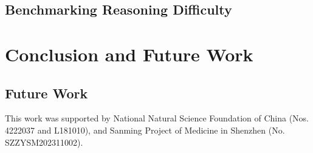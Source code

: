 \documentclass[sigconf, nonacm]{acmart}
\begin{document}
\subsection{Benchmarking Reasoning Difficulty}


\section{Conclusion and Future Work}


\subsection{Future Work}


\begin{acks}
This work was supported by National Natural Science Foundation of China (Nos. 4222037 and L181010), and Sanming Project of Medicine in Shenzhen (No. SZZYSM202311002).
\end{acks}




\end{document}
